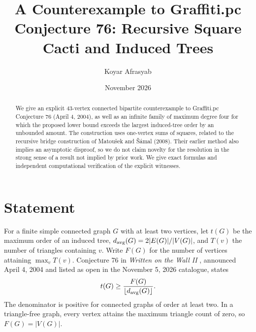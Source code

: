 \documentclass[11pt,a4paper]{article}
\title{A Counterexample to Graffiti.pc Conjecture 76: Recursive Square Cacti and Induced Trees}
\author{Koyar Afrasyab}
\date{November 2026}
\begin{document}
\maketitle
\begin{abstract}
We give an explicit 43-vertex connected bipartite counterexample to Graffiti.pc Conjecture 76 (April 4, 2004), as well as an infinite family of maximum degree four for which the proposed lower bound exceeds the largest induced-tree order by an unbounded amount. The construction uses one-vertex sums of squares, related to the recursive bridge construction of Matou\v{s}ek and \v{S}\'amal (2008). Their earlier method also implies an asymptotic disproof, so we do not claim novelty for the resolution in the strong sense of a result not implied by prior work. We give exact formulas and independent computational verification of the explicit witnesses.
\end{abstract}
\section{Statement}
For a finite simple connected graph $G$ with at least two vertices, let $t(G)$ be the maximum order of an induced tree, $d_{\rm avg}(G)=2|E(G)|/|V(G)|$, and $T(v)$ the number of triangles containing $v$. Write $F(G)$ for the number of vertices attaining $\max_v T(v)$. Conjecture 76 in \emph{Written on the Wall II} \cite{wow}, announced April 4, 2004 and listed as open in the November 5, 2026 catalogue, states
\[
t(G)\ge \frac{F(G)}{\lfloor d_{\rm avg}(G)\rfloor}.
\]
The denominator is positive for connected graphs of order at least two. In a triangle-free graph, every vertex attains the maximum triangle count of zero, so $F(G)=|V(G)|$.
\end{document}
